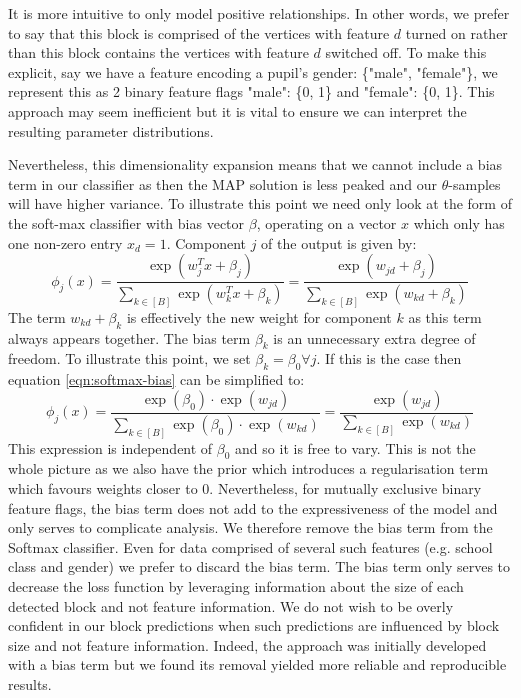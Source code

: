 It is more intuitive to only model positive relationships. In other words, we prefer to say that this block is comprised of the vertices with feature $d$ turned on rather than this block contains the vertices with feature $d$ switched off. To make this explicit, say we have a feature encoding a pupil's gender: \{"male", "female"\}, we represent this as 2 binary feature flags "male": \{0, 1\} and "female": \{0, 1\}. This approach may seem inefficient but it is vital to ensure we can interpret the resulting parameter distributions.

Nevertheless, this dimensionality expansion means that we cannot include a bias term in our classifier as then the MAP solution is less peaked and our $\theta$-samples will have higher variance. To illustrate this point we need only look at the form of the soft-max classifier with bias vector $\beta$, operating on a vector $x$ which only has one non-zero entry $x_d=1$. Component $j$ of the output is given by:
%
\begin{equation}
	\phi_j(x) = \frac{\exp(w_j^T x + \beta_j)}{\sum_{k \in [B]} \exp(w_k^T x + \beta_k)} = 
	\frac{\exp(w_{jd} + \beta_j)}{\sum_{k \in [B]} \exp({w_{kd} + \beta_k})}
	\label{eqn:softmax-bias}
\end{equation}
%
The term $w_{kd} + \beta_k$ is effectively the new weight for component $k$ as this term always appears together. The bias term $\beta_k$ is an unnecessary extra degree of freedom. To illustrate this point, we set $\beta_k=\beta_0 \forall j$. If this is the case then equation \ref{eqn:softmax-bias} can be simplified to:
%
\begin{equation}
	\phi_j(x) = \frac{\exp(\beta_0) \cdot \exp(w_{jd})}{\sum_{k \in [B]} \exp(\beta_0) \cdot \exp(w_{kd})}
	= \frac{\exp(w_{jd})}{\sum_{k \in [B]} \exp(w_{kd})}
\end{equation}
%
This expression is independent of $\beta_0$ and so it is free to vary. This is not the whole picture as we also have the prior which introduces a regularisation term which favours weights closer to 0. Nevertheless, for mutually exclusive binary feature flags, the bias term does not add to the expressiveness of the model and only serves to complicate analysis. We therefore remove the bias term from the Softmax classifier. Even for data comprised of several such features (e.g. school class and gender) we prefer to discard the bias term. The bias term only serves to decrease the loss function by leveraging information about the size of each detected block and not feature information. We do not wish to be overly confident in our block predictions when such predictions are influenced by block size and not feature information. Indeed, the approach was initially developed with a bias term but we found its removal yielded more reliable and reproducible results.